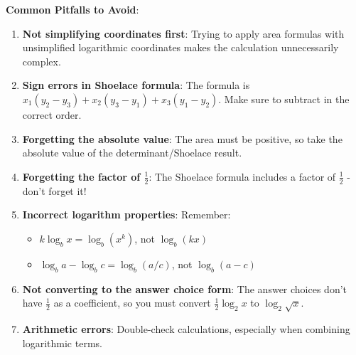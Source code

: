 \documentclass[12pt]{article}
\begin{document}
\begin{warningbox}
\textbf{Common Pitfalls to Avoid}:

\begin{enumerate}
    \item \textbf{Not simplifying coordinates first}: Trying to apply area formulas with unsimplified logarithmic coordinates makes the calculation unnecessarily complex.
    
    \item \textbf{Sign errors in Shoelace formula}: The formula is $x_1(y_2-y_3) + x_2(y_3-y_1) + x_3(y_1-y_2)$. Make sure to subtract in the correct order.
    
    \item \textbf{Forgetting the absolute value}: The area must be positive, so take the absolute value of the determinant/Shoelace result.
    
    \item \textbf{Forgetting the factor of $\frac{1}{2}$}: The Shoelace formula includes a factor of $\frac{1}{2}$ - don't forget it!
    
    \item \textbf{Incorrect logarithm properties}: Remember:
    \begin{itemize}
        \item $k\log_b x = \log_b(x^k)$, not $\log_b(kx)$
        \item $\log_b a - \log_b c = \log_b(a/c)$, not $\log_b(a-c)$
    \end{itemize}
    
    \item \textbf{Not converting to the answer choice form}: The answer choices don't have $\frac{1}{2}$ as a coefficient, so you must convert $\frac{1}{2}\log_2 x$ to $\log_2\sqrt{x}$.
    
    \item \textbf{Arithmetic errors}: Double-check calculations, especially when combining logarithmic terms.
\end{enumerate}
\end{warningbox}
\end{document}
